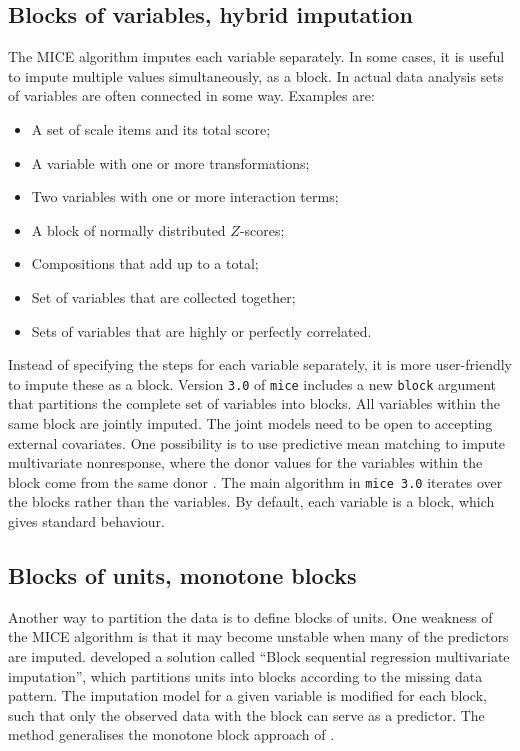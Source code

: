 \documentclass[
]{book}
\providecommand{\tightlist}{%
  \setlength{\itemsep}{0pt}\setlength{\parskip}{0pt}}
\begin{document}
\subsection{Blocks of variables, hybrid imputation}\label{sec:blockvar}

The MICE algorithm imputes each variable separately. In some cases, it is useful to impute multiple values simultaneously, as a block. In actual data analysis sets of variables are often connected in some way. Examples are:

\begin{itemize}
\tightlist
\item
  A set of scale items and its total score;
\item
  A variable with one or more transformations;
\item
  Two variables with one or more interaction terms;
\item
  A block of normally distributed \(Z\)-scores;
\item
  Compositions that add up to a total;
\item
  Set of variables that are collected together;
\item
  Sets of variables that are highly or perfectly correlated.
\end{itemize}

Instead of specifying the steps for each variable separately, it is more user-friendly to impute these as a block. Version \texttt{3.0} of \texttt{mice} includes a new \texttt{block} argument that partitions the complete set of variables into blocks. All variables within the same block are jointly imputed. The joint models need to be open to accepting external covariates. One possibility is to use predictive mean matching to impute multivariate nonresponse, where the donor values for the variables within the block come from the same donor \citep{LITTLE1988}. The main algorithm in \texttt{mice\ 3.0} iterates over the blocks rather than the variables. By default, each variable is a block, which gives standard behaviour.

\subsection{Blocks of units, monotone blocks}\label{sec:blockunit}

Another way to partition the data is to define blocks of units. One weakness of the MICE algorithm is that it may become unstable when many of the predictors are imputed. \citet{ZHU2016} developed a solution called ``Block sequential regression multivariate imputation'', which partitions units into blocks according to the missing data pattern. The imputation model for a given variable is modified for each block, such that only the observed data with the block can serve as a predictor. The method generalises the monotone block approach of \citet{LI2014}.
\end{document}
